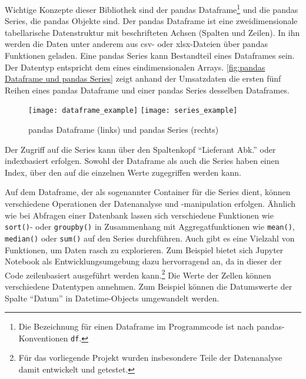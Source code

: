     Wichtige Konzepte dieser Bibliothek sind der pandas Dataframe\footnote{Die Bezeichnung für einen Dataframe im Programmcode ist nach pandas-Konventionen \texttt{df}.} und die pandas Series, die pandas Objekte sind. Der pandas Dataframe ist eine zweidimensionale 
    tabellarische Datenstruktur mit beschrifteten Achsen (Spalten und Zeilen). In ihn
    werden die Daten unter anderem aus csv- oder xlsx-Dateien über pandas Funktionen geladen.
    Eine pandas Series kann Bestandteil eines Dataframes sein. Der Datentyp entspricht dem eines eindimensionalen Arrays. 
    \autoref{fig:pandas Dataframe und pandas Series} zeigt anhand der Umsatzdaten die ersten fünf Reihen
    eines pandas Dataframe und einer pandas Series desselben Dataframes. 
    
    
    \begin{figure}[H]
        \centering
            \texttt{[image: dataframe\_example]}
            \hspace{1cm}
            \texttt{[image: series\_example]}
            \caption{pandas Dataframe (links) und pandas Series (rechts)}
            \label{fig:pandas Dataframe und pandas Series}
    \end{figure}

    Der Zugriff auf die Series kann über den Spaltenkopf \enquote{Lieferant Abk.} oder indexbasiert erfolgen. 
    Sowohl der Dataframe als auch die Series haben einen Index, über den auf die einzelnen Werte zugegriffen werden kann. 
    
    Auf dem Dataframe, der als sogenannter Container für die Series dient, können verschiedene Operationen der Datenanalyse und 
    -manipulation erfolgen. Ähnlich wie bei Abfragen einer Datenbank lassen sich verschiedene Funktionen wie \texttt{sort()}- oder \texttt{groupby()}
    in Zusammenhang mit Aggregatfunktionen wie \texttt{mean()}, \texttt{median()} oder \texttt{sum()} auf den Series durchführen.
    Auch gibt es eine Vielzahl von Funktionen, um Daten rasch zu explorieren. Zum Beispiel bietet sich Jupyter Notebook als
    Entwicklungsumgebung dazu hervorragend an, da in dieser der Code zeilenbasiert ausgeführt werden kann.\footnote{Für das vorliegende Projekt wurden 
    insbesondere Teile der Datenanalyse damit entwickelt und getestet.} Die Werte der Zellen können verschiedene Datentypen
    annehmen. Zum Beispiel können die Datumswerte der Spalte \enquote{Datum} in Datetime-Objects umgewandelt werden.

